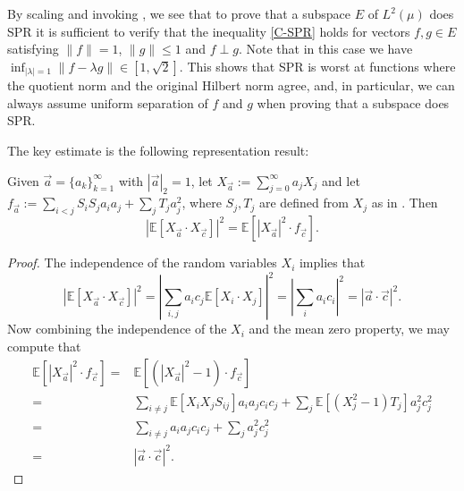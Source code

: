 \documentclass{inprogress}
\begin{document}
By scaling and invoking , we see that to prove that a subspace $E$ of $L^2(\mu)$ does SPR it is sufficient to verify that        the inequality \eqref{C-SPR} holds for vectors $f,g\in E$ satisfying $\|f\|=1$, $\|g\|\leq 1$ and $f\perp g$. Note that in this case we have $\inf_{|\lambda|=1}\|f-\lambda g\|\in [1,\sqrt{2}]$. This shows that SPR is worst at functions where the quotient norm and the original Hilbert norm agree, and, in particular, we can always assume uniform separation of $f$ and $g$ when proving that a subspace does SPR.





The key estimate is the following representation result:

\begin{lemma} \label{lem:duality_terms}
    Given $\vec a = \{a_k\}_{k=1}^\infty$ with $|\vec a|_2 = 1$, let $X_{\vec a}:= \sum_{j=0}^\infty a_j X_j$ and let $f_{\vec a}:=  \sum_{i<j} S_i S_j a_i a_j + \sum_{j} T_j a_j^2$, where $S_j, T_j$ are defined from $X_j$ as in . Then 
    $$
    |\mathbb E[X_{\vec a}\cdot X_{\vec c}]|^2 = \mathbb E [|X_{\vec a}|^2 \cdot f_{\vec c}].
    $$
\end{lemma}
\begin{proof}
    The independence of the random variables $X_i$ implies that 
    $$|\mathbb E[X_{\vec a}\cdot X_{\vec c}]|^2 = \left|\sum_{i,j} a_i c_j \mathbb E[X_i\cdot X_j]\right|^2  = \left|\sum_{i} a_i c_i\right|^2 =|\vec a \cdot \vec c|^2.$$
    Now combining the independence of the $X_i$ and the mean zero property, we may compute that
    $$
    \begin{aligned}
        \mathbb E [|X_{\vec a}|^2\cdot f_{\vec c}] 
        = &
        \mathbb E [(|X_{\vec a}|^2 -1)\cdot f_{\vec c}] 
        \\= &
        \sum_{i\neq j} \mathbb E[X_{i}X_j S_{ij}] a_i a_j c_i c_j+
        \sum_{j} \mathbb E[(X_j^2-1) T_j] a_j^2 c_j^2
        \\= &
        \sum_{i\neq j} a_i a_j c_i c_j+
        \sum_{j}  a_j^2 c_j^2
        \\= &
        |\vec a \cdot \vec c|^2.
    \end{aligned}
    $$
\end{proof}
\end{document}
